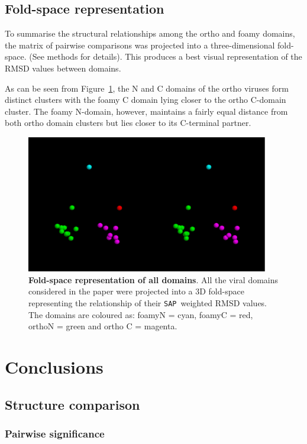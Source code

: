 \documentclass[12pt]{article}
\newcommand{\Fig}[1]{Figure~\ref{Fig:#1}}
\newcommand{\3}{$3_{10}$}
\newcommand{\SAP}{{\tt SAP}}
\begin{document}
\subsection{Fold-space representation}

To summarise the structural relationships among the ortho and foamy domains, the matrix
of pairwise comparisons was projected into a three-dimensional fold-space.  (See methods
for details).   This produces a best visual representation of the RMSD values between domains.

As can be seen from \Fig{space}, the N and C domains of the ortho viruses form distinct
clusters with the foamy C domain lying closer to the ortho C-domain cluster.   The foamy
N-domain, however, maintains a fairly equal distance from both ortho domain clusters but
lies closer to its C-terminal partner.

\begin{figure}
\centering
\includegraphics[width=300pt]{foldspace-space.eps}
\begin{footnotesize}
\caption{
\label{Fig:space}
{\bf Fold-space representation of all domains}.
All the viral domains considered in the paper were projected into a 3D fold-space representing
the relationship of their \SAP\ weighted RMSD values.   The domains are coloured as:
foamyN = cyan, foamyC = red, orthoN = green and ortho C = magenta. 
}
\end{footnotesize}
\end{figure}
\clearpage
%
\section{Conclusions}

\subsection{Structure comparison}

\subsubsection{Pairwise significance}
\end{document}
